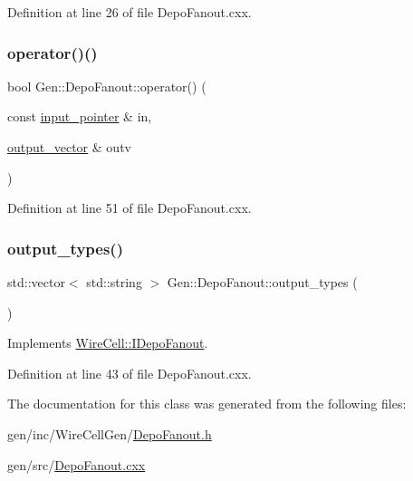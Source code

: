 Definition at line 26 of file Depo\+Fanout.\+cxx.

\mbox{\label{class_wire_cell_1_1_gen_1_1_depo_fanout_a962dbfcaef407243a4089e447b9e554b}} 
\subsubsection{\texorpdfstring{operator()()}{operator()()}}
{\footnotesize\ttfamily bool Gen\+::\+Depo\+Fanout\+::operator() (\begin{DoxyParamCaption}\item[{const \hyperlink{class_wire_cell_1_1_i_fanout_node_aefd36d56a531edf1990fe6e263d9c266}{input\+\_\+pointer} \&}]{in,  }\item[{\hyperlink{class_wire_cell_1_1_i_fanout_node_a650cda83709781daac2d67af7c3706df}{output\+\_\+vector} \&}]{outv }\end{DoxyParamCaption})\hspace{0.3cm}{\ttfamily [virtual]}}



Definition at line 51 of file Depo\+Fanout.\+cxx.

\mbox{\label{class_wire_cell_1_1_gen_1_1_depo_fanout_acb986929b5cd38a5ea197985b103102f}} 
\subsubsection{\texorpdfstring{output\+\_\+types()}{output\_types()}}
{\footnotesize\ttfamily std\+::vector$<$ std\+::string $>$ Gen\+::\+Depo\+Fanout\+::output\+\_\+types (\begin{DoxyParamCaption}{ }\end{DoxyParamCaption})\hspace{0.3cm}{\ttfamily [virtual]}}



Implements \hyperlink{class_wire_cell_1_1_i_depo_fanout_ade8cfbdf790d316516ab8f7a97818f8e}{Wire\+Cell\+::\+I\+Depo\+Fanout}.



Definition at line 43 of file Depo\+Fanout.\+cxx.



The documentation for this class was generated from the following files\+:\begin{DoxyCompactItemize}
\item 
gen/inc/\+Wire\+Cell\+Gen/\hyperlink{_depo_fanout_8h}{Depo\+Fanout.\+h}\item 
gen/src/\hyperlink{_depo_fanout_8cxx}{Depo\+Fanout.\+cxx}\end{DoxyCompactItemize}
